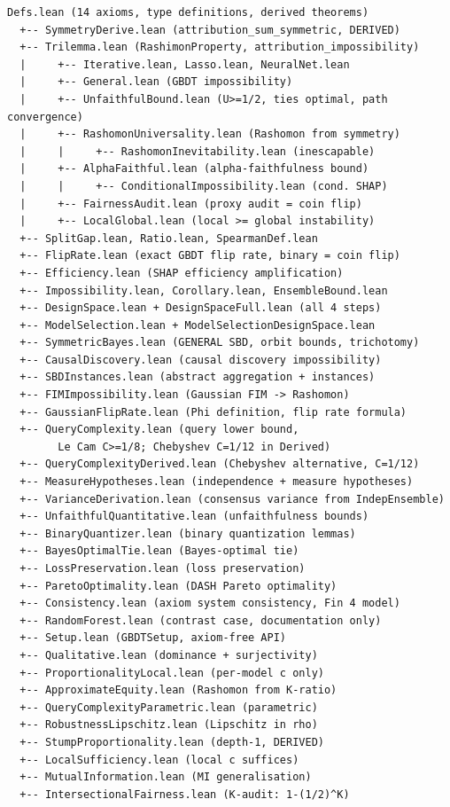 \documentclass{article}
\begin{document}
\begin{verbatim}
Defs.lean (14 axioms, type definitions, derived theorems)
  +-- SymmetryDerive.lean (attribution_sum_symmetric, DERIVED)
  +-- Trilemma.lean (RashimonProperty, attribution_impossibility)
  |     +-- Iterative.lean, Lasso.lean, NeuralNet.lean
  |     +-- General.lean (GBDT impossibility)
  |     +-- UnfaithfulBound.lean (U>=1/2, ties optimal, path convergence)
  |     +-- RashomonUniversality.lean (Rashomon from symmetry)
  |     |     +-- RashomonInevitability.lean (inescapable)
  |     +-- AlphaFaithful.lean (alpha-faithfulness bound)
  |     |     +-- ConditionalImpossibility.lean (cond. SHAP)
  |     +-- FairnessAudit.lean (proxy audit = coin flip)
  |     +-- LocalGlobal.lean (local >= global instability)
  +-- SplitGap.lean, Ratio.lean, SpearmanDef.lean
  +-- FlipRate.lean (exact GBDT flip rate, binary = coin flip)
  +-- Efficiency.lean (SHAP efficiency amplification)
  +-- Impossibility.lean, Corollary.lean, EnsembleBound.lean
  +-- DesignSpace.lean + DesignSpaceFull.lean (all 4 steps)
  +-- ModelSelection.lean + ModelSelectionDesignSpace.lean
  +-- SymmetricBayes.lean (GENERAL SBD, orbit bounds, trichotomy)
  +-- CausalDiscovery.lean (causal discovery impossibility)
  +-- SBDInstances.lean (abstract aggregation + instances)
  +-- FIMImpossibility.lean (Gaussian FIM -> Rashomon)
  +-- GaussianFlipRate.lean (Phi definition, flip rate formula)
  +-- QueryComplexity.lean (query lower bound,
        Le Cam C>=1/8; Chebyshev C=1/12 in Derived)
  +-- QueryComplexityDerived.lean (Chebyshev alternative, C=1/12)
  +-- MeasureHypotheses.lean (independence + measure hypotheses)
  +-- VarianceDerivation.lean (consensus variance from IndepEnsemble)
  +-- UnfaithfulQuantitative.lean (unfaithfulness bounds)
  +-- BinaryQuantizer.lean (binary quantization lemmas)
  +-- BayesOptimalTie.lean (Bayes-optimal tie)
  +-- LossPreservation.lean (loss preservation)
  +-- ParetoOptimality.lean (DASH Pareto optimality)
  +-- Consistency.lean (axiom system consistency, Fin 4 model)
  +-- RandomForest.lean (contrast case, documentation only)
  +-- Setup.lean (GBDTSetup, axiom-free API)
  +-- Qualitative.lean (dominance + surjectivity)
  +-- ProportionalityLocal.lean (per-model c only)
  +-- ApproximateEquity.lean (Rashomon from K-ratio)
  +-- QueryComplexityParametric.lean (parametric)
  +-- RobustnessLipschitz.lean (Lipschitz in rho)
  +-- StumpProportionality.lean (depth-1, DERIVED)
  +-- LocalSufficiency.lean (local c suffices)
  +-- MutualInformation.lean (MI generalisation)
  +-- IntersectionalFairness.lean (K-audit: 1-(1/2)^K)
\end{verbatim}
\end{document}

